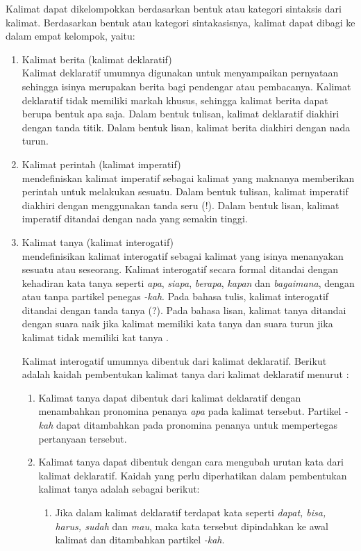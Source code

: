 Kalimat dapat dikelompokkan berdasarkan bentuk atau kategori sintaksis dari kalimat. Berdasarkan bentuk atau kategori sintakasisnya, kalimat dapat dibagi ke dalam empat kelompok, yaitu:
\begin{enumerate}
	\item Kalimat berita (kalimat deklaratif)\\
	Kalimat deklaratif umumnya digunakan untuk menyampaikan pernyataan sehingga isinya merupakan berita bagi pendengar atau pembacanya. Kalimat deklaratif tidak memiliki markah khusus, sehingga kalimat berita dapat berupa bentuk apa saja. Dalam bentuk tulisan, kalimat deklaratif diakhiri dengan tanda titik. Dalam bentuk lisan, kalimat berita diakhiri dengan nada turun.

	\item Kalimat perintah (kalimat imperatif)\\
	\citet{dardjo_et_al} mendefiniskan kalimat imperatif sebagai kalimat yang maknanya memberikan perintah untuk melakukan sesuatu. Dalam bentuk tulisan, kalimat imperatif diakhiri dengan menggunakan tanda seru (!). Dalam bentuk lisan, kalimat imperatif ditandai dengan nada yang semakin tinggi.

	\item Kalimat tanya (kalimat interogatif)\\
	\citet{dardjo_et_al} mendefinisikan kalimat interogatif sebagai kalimat yang isinya menanyakan sesuatu atau seseorang. Kalimat interogatif secara formal ditandai dengan kehadiran kata tanya seperti \emph{apa}, \emph{siapa}, \emph{berapa}, \emph{kapan} dan \emph{bagaimana}, dengan atau tanpa partikel penegas \emph{-kah}. Pada bahasa tulis, kalimat interogatif ditandai dengan tanda tanya (?). Pada bahasa lisan, kalimat tanya ditandai dengan suara naik jika kalimat memiliki kata tanya dan suara turun jika kalimat tidak memiliki kat tanya \citep{alwi}.

	Kalimat interogatif umumnya dibentuk dari kalimat deklaratif. Berikut adalah kaidah pembentukan kalimat tanya dari kalimat deklaratif menurut \citet{alwi}:

	\begin{enumerate}
		\item Kalimat tanya dapat dibentuk dari kalimat deklaratif dengan menambahkan pronomina penanya \emph{apa} pada kalimat tersebut. Partikel \emph{-kah} dapat ditambahkan pada pronomina penanya untuk mempertegas pertanyaan tersebut.

		\item Kalimat tanya dapat dibentuk dengan cara mengubah urutan kata dari kalimat deklaratif. Kaidah yang perlu diperhatikan dalam pembentukan kalimat tanya adalah sebagai berikut:
		\begin{enumerate}
			\item Jika dalam kalimat deklaratif terdapat kata seperti \emph{dapat, bisa, harus, sudah} dan \emph{mau}, maka kata tersebut dipindahkan ke awal kalimat dan ditambahkan partikel \emph{-kah}.


\end{enumerate}
\end{enumerate}
\end{enumerate}
